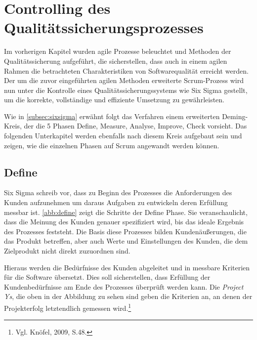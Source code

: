 \chapter{Controlling des Qualitätssicherungsprozesses}



    Im vorherigen Kapitel wurden agile Prozesse beleuchtet und Methoden der Qualitätssicherung aufgeführt, die sicherstellen, dass auch in einem agilen Rahmen die betrachteten Charakteristiken von Softwarequalität erreicht werden. Der um die zuvor eingeführten agilen Methoden erweiterte Scrum-Prozess wird nun unter die Kontrolle eines Qualitätssicherungssystems wie Six Sigma gestellt, um die korrekte, vollständige und effiziente Umsetzung zu gewährleisten.

    Wie in \autoref{subsec:sixsigma} erwähnt folgt das Verfahren einem erweiterten Deming-Kreis, der die 5 Phasen Define, Measure, Analyse, Improve, Check vorsieht. Das folgenden Unterkapitel werden ebenfalls nach diesem Kreis aufgebaut sein und zeigen, wie die einzelnen Phasen auf Scrum angewandt werden können.

    \section{Define}

        Six Sigma schreib vor, dass zu Beginn des Prozesses die Anforderungen des Kunden aufzunehmen um daraus Aufgaben zu entwickeln deren Erfüllung messbar ist.
        \autoref{abb:define} zeigt die Schritte der Define Phase. Sie veranschaulicht, dass die Meinung des Kunden genauer spezifiziert wird, bis das ideale Ergebnis des Prozesses feststeht. Die Basis diese Prozesses bilden Kundenäußerungen, die das Produkt betreffen, aber auch Werte und Einstellungen des Kunden, die dem Zielprodukt nicht direkt zuzuordnen sind.

        Hieraus werden die Bedürfnisse des Kunden abgeleitet und in messbare Kriterien für die Software übersetzt. Dies soll sicherstellen, dass Erfüllung der Kundenbedürfnisse am Ende des Prozesses überprüft werden kann. Die \emph{Project Ys}, die oben in der Abbildung zu sehen sind geben die Kriterien an, an denen der Projekterfolg letztendlich gemessen wird.\footnote{Vgl. Knöfel, 2009, S.48.}

